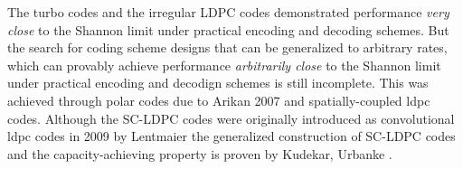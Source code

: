 The turbo codes and the irregular LDPC codes demonstrated performance \emph{very close } to the Shannon limit under practical encoding and decoding schemes. But the search for coding scheme designs that can be generalized to arbitrary rates, which can provably achieve performance \emph{arbitrarily close} to the Shannon limit under practical encoding and decodign schemes is still incomplete. This was achieved through polar codes due to Arikan 2007 and spatially-coupled ldpc codes. Although the SC-LDPC codes were originally introduced as convolutional ldpc codes in 2009 by Lentmaier \etal the generalized construction of SC-LDPC codes and the capacity-achieving property is proven by Kudekar, Urbanke \etal.
